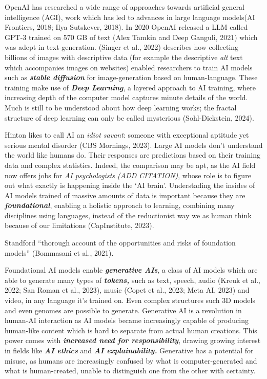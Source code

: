 \documentclass[
  letterpaper,
  DIV=11,
  numbers=noendperiod]{scrartcl}
\begin{document}
OpenAI has researched a wide range of approaches towards artificial
general intelligence (AGI), work which has led to advances in large
language models(AI Frontiers, 2018; Ilya Sutskever, 2018). In 2020
OpenAI released a LLM called GPT-3 trained on 570 GB of text (Alex
Tamkin and Deep Ganguli, 2021) which was adept in text-generation.
(Singer et al., 2022) describes how collecting billions of images with
descriptive data (for example the descriptive \emph{alt} text which
accompanies images on websites) enabled researchers to train AI models
such as \textbf{\emph{stable diffusion}} for image-generation based on
human-language. These training make use of \textbf{\emph{Deep
Learning}}, a layered approach to AI training, where increasing depth of
the computer model captures minute details of the world. Much is still
to be understood about how deep learning works; the fractal structure of
deep learning can only be called mysterious (Sohl-Dickstein, 2024).

Hinton likes to call AI an \emph{idiot savant}: someone with exceptional
aptitude yet serious mental disorder (CBS Mornings, 2023). Large AI
models don't understand the world like humans do. Their responses are
predictions based on their training data and complex statistics. Indeed,
the comparison may be apt, as the AI field now offers jobs for \emph{AI
psychologists (ADD CITATION)}, whose role is to figure out what exactly
is happening inside the `AI brain'. Understading the insides of AI
models trained of massive amounts of data is important because they are
\textbf{\emph{foundational}}, enabling a holistic approach to learning,
combining many disciplines using languages, instead of the reductionist
way we as human think because of our limitations (CapInstitute, 2023).

Standford ``thorough account of the opportunities and risks of
foundation models'' (Bommasani et al., 2021).

Foundational AI models enable \textbf{\emph{generative AIs}}, a class of
AI models which are able to generate many types of
\textbf{\emph{tokens,}} such as text, speech, audio (Kreuk et al., 2022;
San Roman et al., 2023), music (Copet et al., 2023; Meta AI, 2023) and
video, in any language it's trained on. Even complex structures such 3D
models and even genomes are possible to generate. Generative AI is a
revolution in human-AI interaction as AI models became increasingly
capable of producing human-like content which is hard to separate from
actual human creations. This power comes with \textbf{\emph{increased
need for responsibility}}, drawing growing interest in fields like
\textbf{\emph{AI ethics}} and \textbf{\emph{AI explainability.}}
Generative has a potential for misuse, as humans are increasingly
confused by what is computer-generated and what is human-created, unable
to distinguish one from the other with certainty.
\end{document}
